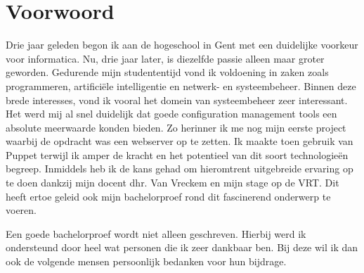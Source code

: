 
\chapter*{Voorwoord}
\label{ch:voorwoord}


Drie jaar geleden begon ik aan de hogeschool in Gent met een duidelijke voorkeur voor informatica. Nu, drie jaar later, is diezelfde passie alleen maar groter geworden. Gedurende mijn studententijd vond ik voldoening in zaken zoals programmeren, artifici\"ele intelligentie en netwerk- en systeembeheer. Binnen deze brede interesses, vond ik vooral het domein van systeembeheer zeer interessant.
 \newline
Het werd mij al snel duidelijk dat goede configuration management tools een absolute meerwaarde konden bieden. Zo herinner ik me nog mijn eerste project waarbij de opdracht was een webserver op te zetten. Ik maakte toen gebruik van Puppet terwijl ik amper de kracht en het potentieel van dit soort technologie\"en begreep. Inmiddels heb ik de kans gehad om hieromtrent uitgebreide ervaring op te doen dankzij mijn docent dhr. Van Vreckem en mijn stage op de \gls{VRT}. Dit heeft ertoe geleid ook mijn bachelorproef rond dit fascinerend onderwerp te voeren.

Een goede bachelorproef wordt niet alleen geschreven. Hierbij werd ik ondersteund door heel wat personen die ik zeer dankbaar ben. Bij deze wil ik dan ook de volgende mensen persoonlijk bedanken voor hun bijdrage.

